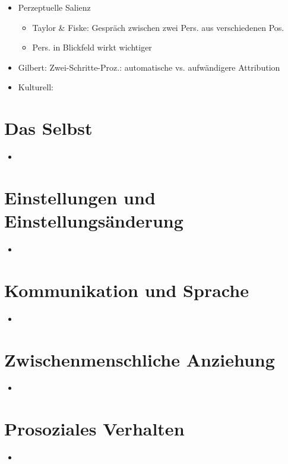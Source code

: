 \documentclass[11pt, paper=a4, twocolumn]{scrartcl}
\begin{document}
\begin{itemize}
\begin{itemize}
\begin{itemize}
\begin{itemize}
								\end{itemize}
							\item Perzeptuelle Salienz
								\begin{itemize}
									\item Taylor \& Fiske: Gespräch zwischen zwei Pers. aus verschiedenen Pos.
									\item Pers. in Blickfeld wirkt wichtiger
								\end{itemize}
							\item Gilbert: Zwei-Schritte-Proz.: automatische vs. aufwändigere Attribution
							\item Kulturell:
						\end{itemize}
				\end{itemize}
		\end{itemize}


	\section{Das Selbst}
		\begin{itemize}
			\item 
		\end{itemize}

	\section{Einstellungen und Einstellungsänderung}
		\begin{itemize}
			\item
		\end{itemize}
	
	\section{Kommunikation und Sprache}
		\begin{itemize}
			\item
		\end{itemize}


	\section{Zwischenmenschliche Anziehung}
		\begin{itemize}
			\item
		\end{itemize}



	\section{Prosoziales Verhalten}
		\begin{itemize}
			\item
		\end{itemize}
\end{document}

